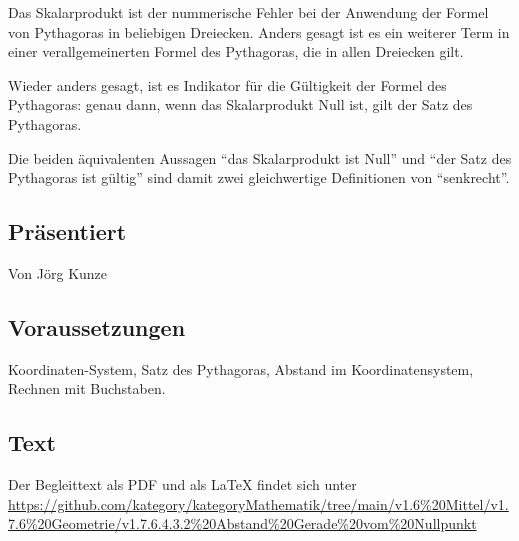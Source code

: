 \documentclass[a4paper]{amsart}
\theoremstyle{definition}
\begin{document}
Das Skalarprodukt ist der nummerische Fehler bei der Anwendung der Formel von Pythagoras in beliebigen Dreiecken. Anders gesagt ist es ein weiterer Term in einer verallgemeinerten Formel des Pythagoras, die in allen Dreiecken gilt.

Wieder anders gesagt, ist es Indikator für die Gültigkeit der Formel des Pythagoras: genau dann, wenn das Skalarprodukt Null ist, gilt der Satz des Pythagoras.

Die beiden äquivalenten Aussagen "`das Skalarprodukt ist Null"' und "`der Satz des Pythagoras ist gültig"' sind damit zwei gleichwertige Definitionen von "`senkrecht"'.

\subsection*{Präsentiert}
Von Jörg Kunze

\subsection*{Voraussetzungen}
Koordinaten-System, Satz des Pythagoras, Abstand im Koordinatensystem, Rechnen mit Buchstaben.

\subsection*{Text}
Der Begleittext als PDF und als LaTeX findet sich unter
{\tiny
   \url{https://github.com/kategory/kategoryMathematik/tree/main/v1.6%20Mittel/v1.7.6%20Geometrie/v1.7.6.4.3.2%20Abstand%20Gerade%20vom%20Nullpunkt}
}

\end{document}
